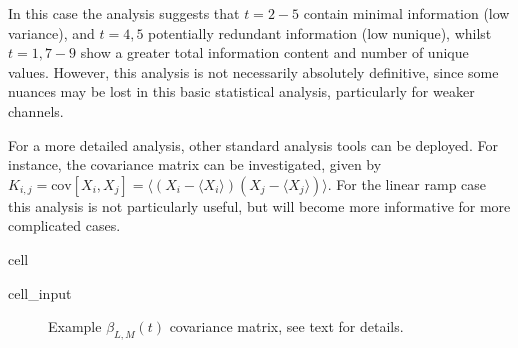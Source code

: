 \documentclass[letterpaper,table,10pt,english]{jupyterBook}
\begin{document}
\sphinxAtStartPar
In this case the analysis suggests that \(t=2 - 5\) contain minimal information (low variance), and \(t=4,5\) potentially redundant information (low nunique), whilst \(t=1,7 - 9\) show a greater total information content and number of unique values. However, this analysis is not necessarily absolutely definitive, since some nuances may be lost in this basic statistical analysis, particularly for weaker channels.

\sphinxAtStartPar
For a more detailed analysis, other standard analysis tools can be deployed. For instance, the covariance matrix can be investigated, given by \(K_{i,j}=\textrm{cov}[X_{i},X_{j}]=\langle(X_{i}-\langle X_{i}\rangle)(X_{j}-\langle X_{j}\rangle)\rangle\). For the linear ramp case this analysis is not particularly useful, but will become more informative for more complicated cases.

\begin{sphinxuseclass}{cell}\begin{sphinxVerbatimInput}

\begin{sphinxuseclass}{cell_input}
\begin{sphinxVerbatim}[commandchars=\\\{\}]
  

  
\end{sphinxVerbatim}

\end{sphinxuseclass}\end{sphinxVerbatimInput}

\end{sphinxuseclass}
\begin{figure}[htbp]
\centering
\capstart

\noindent{}
\caption{Example \(\beta_{L,M}(t)\) covariance matrix, see text for details.}\label{\detokenize{part1/theory_info_content_200723:fig-covmatblmexample}}\end{figure}
\end{document}
